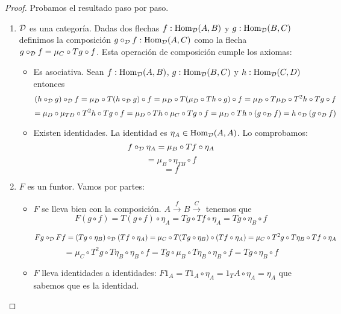 \begin{proof}
  Probamos el resultado paso por paso.
  \begin{enumerate}
  \item $\mathcal{D}$ es una categoría. Dadas dos flechas $f : \operatorname{Hom}_{\mathcal{D}}(A, B)$ y
    $g: \operatorname{Hom}_{\mathcal{D}}(B, C)$ definimos la composición $g \circ_{\mathcal{D}} f : \operatorname{Hom}_{\mathcal{D}}(A, C)$
    como la flecha $g \circ_{\mathcal{D}} f = \mu_{C} \circ Tg \circ f$. Esta operación
    de composición cumple los axiomas:

    \begin{itemize}
    \item Es asociativa. Sean $f : \operatorname{Hom}_{\mathcal{D}}(A, B)$, $g : \operatorname{Hom}_{\mathcal{D}}(B, C)$
      y $h : \operatorname{Hom}_{\mathcal{D}}(C, D)$ entonces
      $$(h \circ_{\mathcal{D}} g) \circ_{\mathcal{D}} f = \mu_D \circ T(h \circ_{\mathcal{D}} g) \circ f
      = \mu_D \circ T(\mu_D \circ Th \circ g) \circ f
      = \mu_D \circ T\mu_D \circ T^2h \circ Tg \circ f$$
      $$= \mu_D \circ \mu_{TD} \circ T^2h \circ Tg \circ f
      =\mu_D \circ Th \circ \mu_C \circ Tg \circ f
      =\mu_D \circ Th \circ (g \circ_{\mathcal{D}} f)
      = h \circ_{\mathcal{D}} (g \circ_{\mathcal{D}} f)$$

    \item Existen identidades. La identidad es $\eta_A \in \operatorname{Hom}_{\mathcal{D}}(A, A)$. Lo
      comprobamos:
      $$f \circ_{\mathcal{D}} \eta_A = \mu_B \circ Tf \circ \eta_A$$
      $$= \mu_B \circ \eta_{TB} \circ f$$
      $$= f $$
    \end{itemize}
  \item $F$ es un funtor. Vamos por partes:
    \begin{itemize}
    \item $F$ se lleva bien con la composición.
      $A \xrightarrow{f} B \xrightarrow{C}$ tenemos que
      $$F(g \circ f) = T(g \circ f) \circ \eta_A = Tg \circ Tf \circ \eta_A
      = Tg \circ \eta_B \circ f$$

      $$Fg \circ_{\mathcal{D}} Ff = (Tg \circ \eta_B) \circ_{\mathcal{D}} (Tf \circ \eta_A)
      = \mu_C \circ T(Tg \circ \eta_B) \circ (Tf \circ \eta_A)
      = \mu_C \circ T^2g \circ T\eta_B \circ Tf \circ \eta_A$$
      $$= \mu_C \circ T^2g \circ T\eta_B \circ \eta_B \circ f
      = Tg \circ \mu_B \circ T\eta_B \circ \eta_B \circ f
      = Tg \circ \eta_B \circ f$$


    \item $F$ lleva identidades a identidades: $F1_A = T1_A \circ \eta_A = 1_TA \circ \eta_A = \eta_A$ que
    sabemos que es la identidad.

    \end{itemize}


\end{enumerate}
\end{proof}
